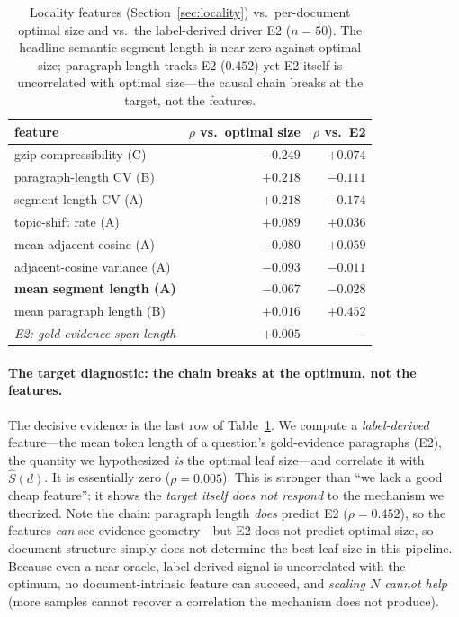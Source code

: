 \documentclass[11pt]{article}
\begin{document}
\begin{table}[t]
\centering
\caption{Locality features (Section~\ref{sec:locality}) vs.\ per-document optimal
size and vs.\ the label-derived driver E2 ($n{=}50$). The headline
semantic-segment length is near zero against optimal size; paragraph length tracks
E2 ($0.452$) yet E2 itself is uncorrelated with optimal size---the causal chain
breaks at the target, not the features.}
\label{tab:locality}
\begin{tabular}{lrr}
\toprule
feature & $\rho$ vs.\ optimal size & $\rho$ vs.\ E2 \\
\midrule
gzip compressibility (C)              & $-0.249$ & $+0.074$ \\
paragraph-length CV (B)               & $+0.218$ & $-0.111$ \\
segment-length CV (A)                 & $+0.218$ & $-0.174$ \\
topic-shift rate (A)                  & $+0.089$ & $+0.036$ \\
mean adjacent cosine (A)              & $-0.080$ & $+0.059$ \\
adjacent-cosine variance (A)          & $-0.093$ & $-0.011$ \\
\textbf{mean segment length (A)}      & $\mathbf{-0.067}$ & $-0.028$ \\
mean paragraph length (B)             & $+0.016$ & $\mathbf{+0.452}$ \\
\midrule
\emph{E2: gold-evidence span length}  & $\mathbf{+0.005}$ & --- \\
\bottomrule
\end{tabular}
\end{table}

\paragraph{The target diagnostic: the chain breaks at the optimum, not the
features.} The decisive evidence is the last row of Table~\ref{tab:locality}. We
compute a \emph{label-derived} feature---the mean token length of a question's
gold-evidence paragraphs (E2), the quantity we hypothesized \emph{is} the optimal
leaf size---and correlate it with $\hat S(d)$. It is essentially zero
($\rho=0.005$). This is stronger than ``we lack a good cheap feature'': it shows
the \emph{target itself does not respond} to the mechanism we theorized. Note the
chain: paragraph length \emph{does} predict E2 ($\rho=0.452$), so the features
\emph{can} see evidence geometry---but E2 does not predict optimal size, so
document structure simply does not determine the best leaf size in this pipeline.
Because even a near-oracle, label-derived signal is uncorrelated with the optimum,
no document-intrinsic feature can succeed, and \emph{scaling $N$ cannot help}
(more samples cannot recover a correlation the mechanism does not produce).
\end{document}

